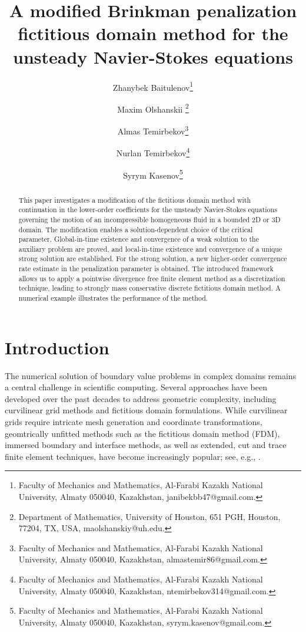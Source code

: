 \documentclass[11pt]{article}
\begin{document}
\title{A modified Brinkman penalization fictitious domain method for the unsteady Navier-Stokes equations}

\author{
	\and Zhanybek Baitulenov\thanks{Faculty of Mechanics and Mathematics, Al-Farabi Kazakh National University, Almaty 050040, Kazakhstan, janibekbb47@gmail.com.} \and Maxim Olshanskii \thanks{Department of Mathematics, University of Houston, 651 PGH, Houston, 77204, TX, USA, 
		maolshanskiy@uh.edu. } \and Almas Temirbekov\thanks{Faculty of Mechanics and Mathematics, Al-Farabi Kazakh National University, Almaty 050040, Kazakhstan, almastemir86@gmail.com.} \and Nurlan Temirbekov\thanks{Faculty of Mechanics and Mathematics, Al-Farabi Kazakh National University, Almaty 050040, Kazakhstan, ntemirbekov314@gmail.com.} \and Syrym Kasenov\thanks{Faculty of Mechanics and Mathematics, Al-Farabi Kazakh National University, Almaty 050040, Kazakhstan, syrym.kasenov@gmail.com.} 
}

\maketitle

\begin{abstract} This paper investigates a modification of the fictitious domain method with continuation in the lower-order coefficients for the unsteady Navier-Stokes equations governing the motion of an incompressible homogeneous fluid in a bounded 2D or 3D domain. The modification enables {a solution-dependent} choice of the critical parameter. Global-in-time existence and convergence of a weak solution to the auxiliary problem are proved, and local-in-time existence and convergence of a unique strong solution are established. For the strong solution, a new higher-order convergence rate estimate in the penalization parameter is obtained. The introduced framework  allows us to apply a pointwise divergence free finite element method as a discretization technique, leading to strongly mass conservative discrete  fictitious domain method. A numerical example illustrates the performance of the method.
\end{abstract}

\section{Introduction}

The numerical solution of boundary value problems in complex domains remains a central challenge in scientific computing. Several approaches have been developed over the past decades to address geometric complexity, including curvilinear grid methods and fictitious domain formulations. While curvilinear grids require intricate mesh generation and coordinate transformations, geomtrically unfitted methods such as the fictitious domain method (FDM), immersed boundary and interface methods, as well as extended, cut and trace finite element techniques, have become increasingly popular; see, e.g., \cite{Glowinski1994,peskin2002immersed,leveque1994immersed,belytschko1999elastic,burman2025cut,olshanskii2018trace,Lehrenfeld2016}.
\end{document}
